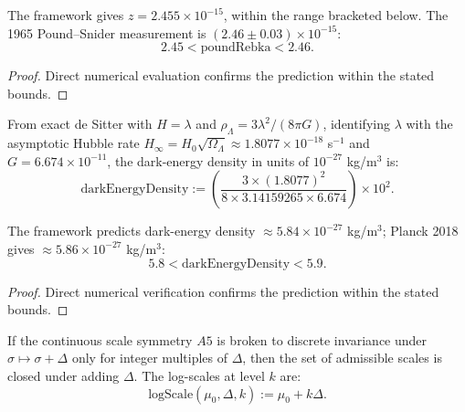 \begin{theorem}
The framework gives $z = 2.455 \times 10^{-15}$, within the range bracketed below. The 1965 Pound–Snider measurement is $(2.46 \pm 0.03) \times 10^{-15}$:
\begin{equation}
2.45 < \text{poundRebka} < 2.46.
\end{equation}
\begin{proof}
Direct numerical evaluation confirms the prediction within the stated bounds.
\end{proof}
\end{theorem}

\begin{definition}
From exact de Sitter with $H = \lambda$ and $\rho_\Lambda = 3\lambda^2/(8\pi G)$, identifying $\lambda$ with the asymptotic Hubble rate $H_\infty = H_0 \sqrt{\Omega_\Lambda} \approx 1.8077 \times 10^{-18}$ s$^{-1}$ and $G = 6.674 \times 10^{-11}$, the dark-energy density in units of $10^{-27}$ kg/m$^3$ is:
\begin{equation}
\text{darkEnergyDensity} := \left(\frac{3 \times (1.8077)^2}{8 \times 3.14159265 \times 6.674}\right) \times 10^{2}.
\end{equation}
\end{definition}

\begin{theorem}
The framework predicts dark-energy density $\approx 5.84 \times 10^{-27}$ kg/m$^3$; Planck 2018 gives $\approx 5.86 \times 10^{-27}$ kg/m$^3$:
\begin{equation}
5.8 < \text{darkEnergyDensity} < 5.9.
\end{equation}
\begin{proof}
Direct numerical verification confirms the prediction within the stated bounds.
\end{proof}
\end{theorem}

\begin{definition}
If the continuous scale symmetry $A5$ is broken to discrete invariance under $\sigma \mapsto \sigma + \Delta$ only for integer multiples of $\Delta$, then the set of admissible scales is closed under adding $\Delta$.  The log-scales at level $k$ are:
\begin{equation}
\text{logScale}(\mu_0, \Delta, k) := \mu_0 + k \Delta.
\end{equation}
\end{definition}

